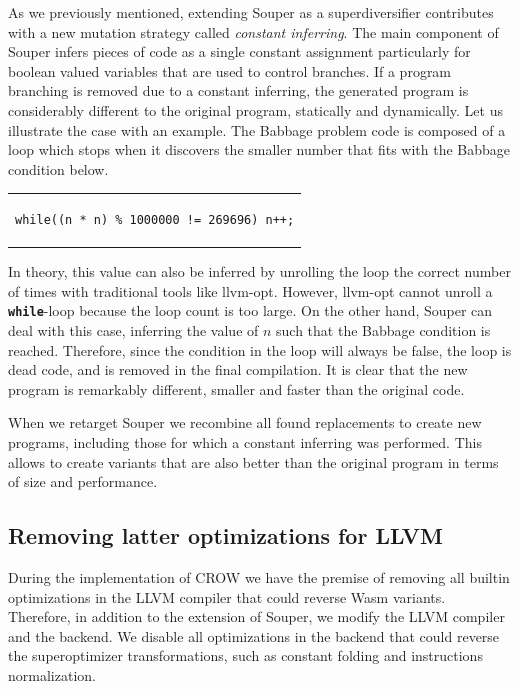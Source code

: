 As we previously mentioned, extending Souper as a superdiversifier contributes with a new mutation strategy called \emph{constant inferring}. 
The main component of Souper infers pieces of code as a single constant assignment particularly for boolean valued variables that are used to control branches.
If a program branching is removed due to a constant inferring, the generated program is considerably different to the original program, statically and dynamically.
Let us illustrate the case with an example.
The Babbage problem code is composed of a loop which stops when it discovers the smaller number that fits with the Babbage condition below.
\begin{center}
\begin{tabular}{c}

\lstset{language=C++,
                    style=CStyle,
                    basicstyle=\small\ttfamily,
                    columns=fullflexible,
                    breaklines=true, 
                    postbreak=\mbox{\textcolor{red}{$\hookrightarrow$}\space}}
\begin{lstlisting}[]
while((n * n) % 1000000 != 269696) n++;
\end{lstlisting}
\end{tabular}
\end{center}
In theory, this value can also be inferred by unrolling the loop the correct number of times with traditional tools like llvm-opt.
However, llvm-opt cannot unroll a \texttt{\textbf{while}}-loop because the loop count is too large.
On the other hand, Souper can deal with this case, inferring the value of $n$ such that the Babbage condition is reached. Therefore, since the condition in the loop will always be false, the loop is dead code, and is removed in the final compilation. It is clear that the new program is remarkably different, smaller and faster than the original code.

When we retarget Souper we recombine all found replacements to create new programs, including those for which a constant inferring was performed.
This allows to create variants that are also better than the original program in terms of size and performance.

\subsection*{Removing latter optimizations for LLVM}

During the implementation of CROW we have the premise of removing all builtin optimizations in the LLVM compiler that could reverse Wasm variants.
Therefore, in addition to the extension of Souper, we modify the LLVM compiler and the \wasm backend.
We disable all optimizations in the \wasm backend that could reverse the superoptimizer transformations, such as constant folding and instructions normalization.


